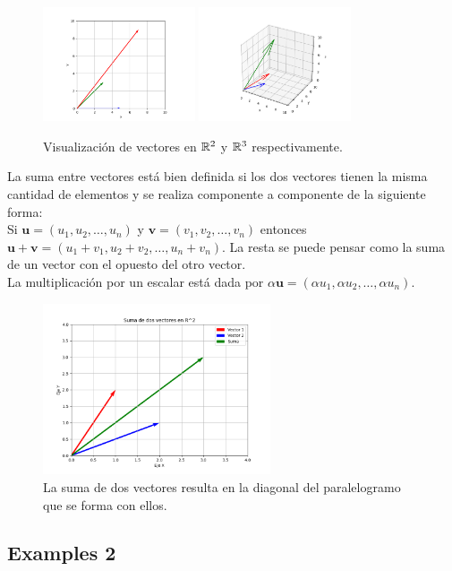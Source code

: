 \begin{figure}[htbp]
    \centering
    \includegraphics[width=0.4\textwidth]{Images/1/vectors.png}
    \hspace{2cm} 
    \includegraphics[width=0.4\textwidth]{Images/1/vectors_3d.png}
    \caption{Visualización de vectores en $\mathbb{R}^2$ y $\mathbb{R}^3$ respectivamente.}
    \label{fig:vectores_en_el_plano}
\end{figure}

La suma entre vectores está bien definida si los dos vectores tienen la misma cantidad de elementos y se realiza componente a componente de la siguiente forma:\\
Si $\mathbf{u} = (u_1, u_2, \ldots, u_n)$ y $\mathbf{v} = (v_1, v_2, \ldots, v_n)$ entonces $\mathbf{u} + \mathbf{v} = (u_1 + v_1, u_2 + v_2, \ldots, u_n + v_n)$. 
La resta se puede pensar como la suma de un vector con el opuesto del otro vector.\\
La multiplicación por un escalar está dada por $\alpha \mathbf{u} = (\alpha u_1, \alpha u_2, \ldots, \alpha u_n)$. 

\begin{figure}[htbp]
    \centering
    \includegraphics[width=0.6\textwidth]{Images/1/sum_of_two_vectors.png}
    \caption{La suma de dos vectores resulta en la diagonal del paralelogramo que se forma con ellos.}
    \label{fig:suma_de_vectores}
\end{figure}

\subsection{Examples 2}

